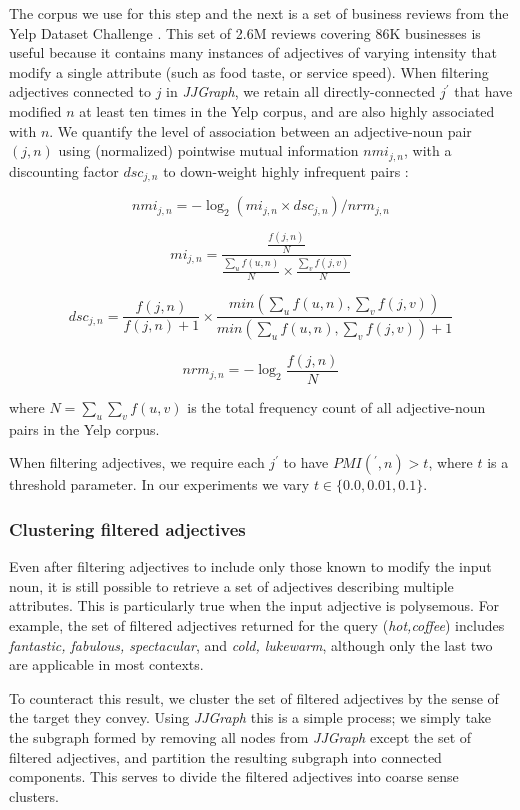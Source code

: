 \documentclass[11pt,a4paper]{article}
\begin{document}
The corpus we use for this step and the next is a set of business reviews from the Yelp Dataset Challenge \cite{yelpdataset}. This set of 2.6M reviews covering 86K businesses is useful because it contains many instances of adjectives of varying intensity that modify a single attribute (such as food taste, or service speed).
When filtering adjectives connected to $j$ in \textit{JJGraph}, we retain all directly-connected $j^\prime$ that have modified $n$ at least ten times in the Yelp corpus, and are also highly associated with $n$. We quantify the level of association between an adjective-noun pair $(j,n)$ using (normalized) pointwise mutual information $nmi_{j,n}$, with a discounting factor $dsc_{j,n}$ to down-weight highly infrequent pairs \cite{pantel2002discovering}:

\[nmi_{j,n} = -\log_2(mi_{j,n} \times dsc_{j,n}) / nrm_{j,n}\]

\[mi_{j,n} = \frac{\frac{f(j,n)}{N}}{\frac{\sum_u f(u,n)}{N} \times \frac{\sum_v f(j,v)}{N}}\]

\[dsc_{j,n} = \frac{f(j,n)}{f(j,n)+1} \times \frac{min(\sum_u f(u,n), \sum_v f(j,v))}{min(\sum_u f(u,n), \sum_v f(j,v)) + 1}\]

\[nrm_{j,n} = -\log_2 \frac{f(j,n)}{N}\]

\noindent where $N=\sum_u \sum_v f(u,v)$ is the total frequency count of all adjective-noun pairs in the Yelp corpus.

When filtering adjectives, we require each $j^\prime$ to have $PMI(^\prime, n) > t$, where $t$ is a threshold parameter. In our experiments we vary $t \in \{0.0, 0.01, 0.1\}$.

\subsubsection{Clustering filtered adjectives}

Even after filtering adjectives to include only those known to modify the input noun, it is still possible to retrieve a set of adjectives describing multiple attributes. This is particularly true when the input adjective is polysemous. For example, the set of filtered adjectives returned for the query (\textit{hot,coffee}) includes \textit{fantastic, fabulous, spectacular}, and \textit{cold, lukewarm}, although only the last two are applicable in most contexts.

To counteract this result, we cluster the set of filtered adjectives by the sense of the target they convey. Using \textit{JJGraph} this is a simple process; we simply take the subgraph formed by removing all nodes from  \textit{JJGraph} except the set of filtered adjectives, and partition the resulting subgraph into connected components. This serves to divide the filtered adjectives into coarse sense clusters.
\end{document}
